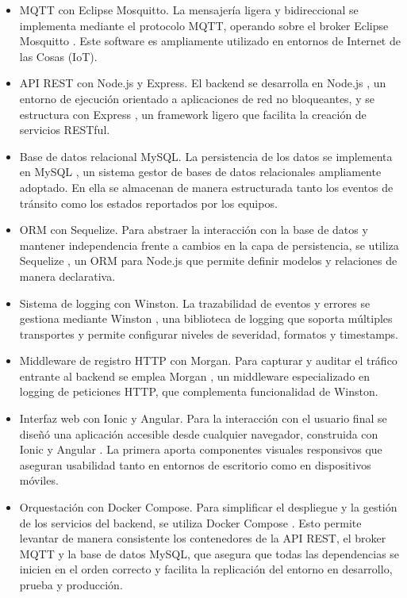 \begin{itemize}

\item MQTT con Eclipse Mosquitto. 
La mensajería ligera y bidireccional se implementa mediante el protocolo MQTT, operando sobre el broker Eclipse Mosquitto \cite{mosquitto}. Este software es ampliamente utilizado en entornos de Internet de las Cosas (IoT).

\item API REST con Node.js  y Express. 
El backend se desarrolla en Node.js \cite{nodejs}, un entorno de ejecución orientado a aplicaciones de red no bloqueantes, y se estructura con Express \cite{expressjs}, un framework ligero que facilita la creación de servicios RESTful.

\item Base de datos relacional MySQL. 
La persistencia de los datos se implementa en MySQL \cite{mysql}, un sistema gestor de bases de datos relacionales ampliamente adoptado. En ella se almacenan de manera estructurada tanto los eventos de tránsito como los estados reportados por los equipos.

\item ORM con Sequelize.
Para abstraer la interacción con la base de datos y mantener independencia frente a cambios en la capa de persistencia, se utiliza Sequelize \cite{sequelize}, un ORM para Node.js que permite definir modelos y relaciones de manera declarativa.  

\item Sistema de logging con Winston.
La trazabilidad de eventos y errores se gestiona mediante Winston \cite{winston}, una biblioteca de logging que soporta múltiples transportes y permite configurar niveles de severidad, formatos y timestamps.  

\item Middleware de registro HTTP con Morgan.
Para capturar y auditar el tráfico entrante al backend se emplea Morgan \cite{morgan}, un middleware especializado en logging de peticiones HTTP, que complementa funcionalidad de Winston.  

\item Interfaz web con Ionic y Angular.
Para la interacción con el usuario final se diseñó una aplicación accesible desde cualquier navegador, construida con Ionic \cite{ionic} y Angular \cite{angular}. La primera aporta componentes visuales responsivos que aseguran usabilidad tanto en entornos de escritorio como en dispositivos móviles.

\item Orquestación con Docker Compose.
Para simplificar el despliegue y la gestión de los servicios del backend, se utiliza Docker Compose \cite{docker_compose}. Esto permite levantar de manera consistente los contenedores de la API REST, el broker MQTT y la base de datos MySQL, que asegura que todas las dependencias se inicien en el orden correcto y facilita la replicación del entorno en desarrollo, prueba y producción.


\end{itemize}
